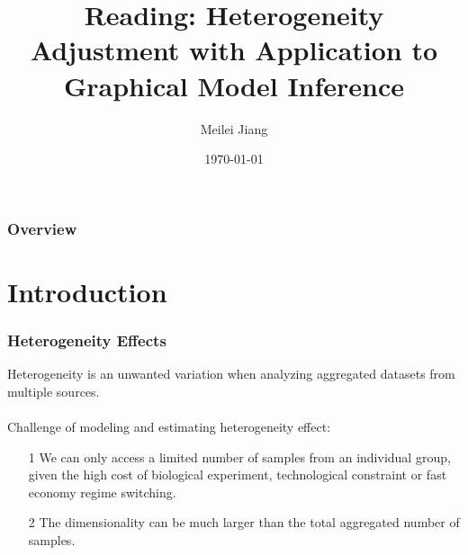 \documentclass{beamer}
\title[Hetererogeneity Adjustment]{Reading: Heterogeneity Adjustment with Application to Graphical Model Inference} %
\author{Meilei Jiang} %
\institute[UNC] %
{
Department of Statistics and Operations Research \\ %
\medskip
University of North Carolina at Chapel Hill %
}
\date{\today} %
\begin{document}
\begin{frame}
\titlepage %
\end{frame}

\begin{frame}
\frametitle{Overview} %
\tableofcontents %
\end{frame}


\section{Introduction} %


\begin{frame}
\frametitle{Heterogeneity Effects}
Heterogeneity is an unwanted variation when analyzing aggregated datasets from multiple sources.\\~\\

Challenge of modeling and estimating heterogeneity effect:
\begin{itemize}
	\item[1] We can only access a limited number of samples from an individual group, given the high cost of biological experiment, technological constraint or fast economy regime switching.
	\item[2] The dimensionality can be much larger than the total aggregated number of samples.
\end{itemize}	
\end{frame}
\end{document}
